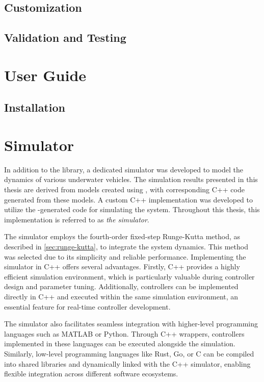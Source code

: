 \subsection{Customization}

\subsection{Validation and Testing}

\section{User Guide}
\subsection{Installation}

\section{Simulator}

In addition to the \pymuvs{} library, a dedicated simulator was developed to 
model the dynamics of various underwater vehicles. The simulation results 
presented in this thesis are derived from models created using \pymuvs{}, with 
corresponding C++ code generated from these models. A custom C++ implementation 
was developed to utilize the \pymuvs{}-generated code for simulating the 
system. Throughout this thesis, this implementation is referred to as 
\textit{the simulator}.

The simulator employs the fourth-order fixed-step Runge-Kutta method, as 
described in \autoref{sec:runge-kutta}, to integrate the system dynamics. This 
method was selected due to its simplicity and reliable performance. 
Implementing the simulator in C++ offers several advantages. Firstly, C++ 
provides a highly efficient simulation environment, which is particularly 
valuable during controller design and parameter tuning. Additionally, 
controllers can be implemented directly in C++ and executed within the same 
simulation environment, an essential feature for real-time controller development.

The simulator also facilitates seamless integration with higher-level 
programming languages such as MATLAB or Python. Through C++ wrappers, 
controllers implemented in these languages can be executed alongside the 
simulation. Similarly, low-level programming languages like Rust, Go, or C can 
be compiled into shared libraries and dynamically linked with the C++ 
simulator, enabling flexible integration across different software ecosystems.

